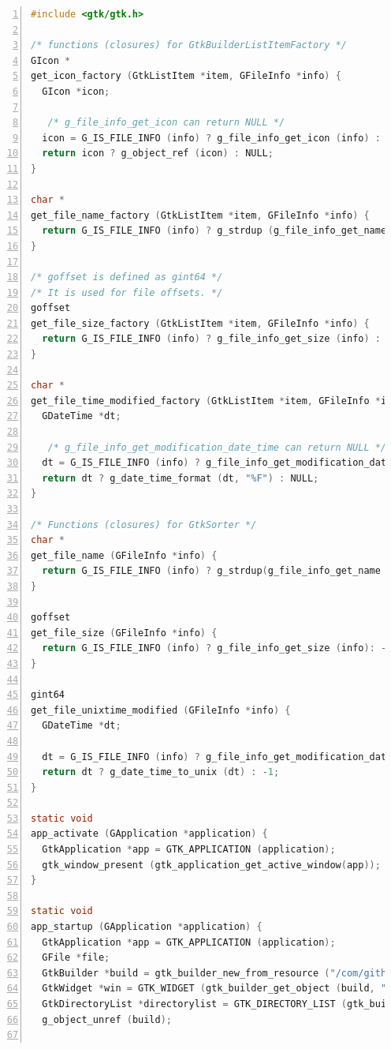 \begin{lstlisting}[language=C, numbers=left]
#include <gtk/gtk.h>

/* functions (closures) for GtkBuilderListItemFactory */
GIcon *
get_icon_factory (GtkListItem *item, GFileInfo *info) {
  GIcon *icon;

   /* g_file_info_get_icon can return NULL */
  icon = G_IS_FILE_INFO (info) ? g_file_info_get_icon (info) : NULL;
  return icon ? g_object_ref (icon) : NULL;
}

char *
get_file_name_factory (GtkListItem *item, GFileInfo *info) {
  return G_IS_FILE_INFO (info) ? g_strdup (g_file_info_get_name (info)) : NULL;
}

/* goffset is defined as gint64 */
/* It is used for file offsets. */
goffset
get_file_size_factory (GtkListItem *item, GFileInfo *info) {
  return G_IS_FILE_INFO (info) ? g_file_info_get_size (info) : -1;
}

char *
get_file_time_modified_factory (GtkListItem *item, GFileInfo *info) {
  GDateTime *dt;

   /* g_file_info_get_modification_date_time can return NULL */
  dt = G_IS_FILE_INFO (info) ? g_file_info_get_modification_date_time (info) : NULL;
  return dt ? g_date_time_format (dt, "%F") : NULL;
}

/* Functions (closures) for GtkSorter */
char *
get_file_name (GFileInfo *info) {
  return G_IS_FILE_INFO (info) ? g_strdup(g_file_info_get_name (info)) : NULL;
}

goffset
get_file_size (GFileInfo *info) {
  return G_IS_FILE_INFO (info) ? g_file_info_get_size (info): -1;
}

gint64
get_file_unixtime_modified (GFileInfo *info) {
  GDateTime *dt;

  dt = G_IS_FILE_INFO (info) ? g_file_info_get_modification_date_time (info) : NULL;
  return dt ? g_date_time_to_unix (dt) : -1;
}

static void
app_activate (GApplication *application) {
  GtkApplication *app = GTK_APPLICATION (application);
  gtk_window_present (gtk_application_get_active_window(app));
}

static void
app_startup (GApplication *application) {
  GtkApplication *app = GTK_APPLICATION (application);
  GFile *file;
  GtkBuilder *build = gtk_builder_new_from_resource ("/com/github/ToshioCP/column/column.ui");
  GtkWidget *win = GTK_WIDGET (gtk_builder_get_object (build, "win"));
  GtkDirectoryList *directorylist = GTK_DIRECTORY_LIST (gtk_builder_get_object (build, "directorylist"));
  g_object_unref (build);


\end{lstlisting}
